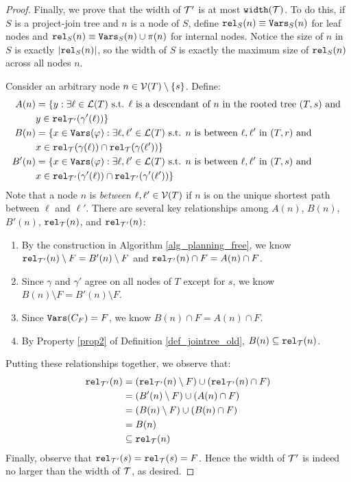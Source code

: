 \begin{proof}
Finally, we prove that the width of $\mathcal{T}'$ is at most $\texttt{\upshape width}(\mathcal{T})$. 
To do this, if $S$ is a project-join tree and $n$ is a node of $S$, define $\texttt{\upshape rel}_S(n) \equiv \texttt{\upshape Vars}_S(n)$ for leaf nodes and $\texttt{\upshape rel}_S(n) \equiv \texttt{\upshape Vars}_S(n) \cup \pi(n)$ for internal nodes. Notice the size of $n$ in $S$ is exactly $|\texttt{\upshape rel}_S(n)|$, so the width of $S$ is exactly the maximum size of $\texttt{\upshape rel}_S(n)$ across all nodes $n$. 

Consider an arbitrary node $n \in \mathcal{V}(T) \setminus \{s\}$. Define:
\begin{align*}
    A(n) &= \{ y : \exists \ell \in \mathcal{L}(T) \text{ s.t. $\ell$ is a descendant of $n$ in the rooted tree $(T, s)$ and } \\&y \in \texttt{\upshape rel}_{\mathcal{T}'}(\gamma'(\ell)) \} \\
    B(n) &= \{ x \in \texttt{\upshape Vars}(\varphi) : \exists \ell, \ell' \in \mathcal{L}(T) \text{ s.t. $n$ is between $\ell, \ell'$ in $(T, r)$ and } \\&x \in \texttt{\upshape rel}_{\mathcal{T}}(\gamma(\ell)) \cap \texttt{\upshape rel}_{\mathcal{T}}(\gamma(\ell')) \} \\
    B'(n) &= \{ x \in \texttt{\upshape Vars}(\varphi) : \exists \ell, \ell' \in \mathcal{L}(T) \text{ s.t. $n$ is between $\ell, \ell'$ in $(T, s)$ and } \\&x \in \texttt{\upshape rel}_{\mathcal{T}'}(\gamma'(\ell)) \cap \texttt{\upshape rel}_{\mathcal{T}'}(\gamma'(\ell')) \}
\end{align*}
Note that a node $n$ is \emph{between} $\ell, \ell' \in \mathcal{V}(T)$ if $n$ is on the unique shortest path between $\ell$ and $\ell'$. There are several key relationships among $A(n)$, $B(n)$, $B'(n)$, $\texttt{\upshape rel}_{\mathcal{T}}(n)$, and $\texttt{\upshape rel}_{\mathcal{T}'}(n)$: 
\begin{enumerate}
    \item By the construction in Algorithm \ref{alg_planning_free}, we know $\texttt{\upshape rel}_{\mathcal{T}'}(n) \setminus F = B'(n) \setminus F$ and $\texttt{\upshape rel}_{\mathcal{T}'}(n) \cap F = A(n) \cap F$.
    \item Since $\gamma$ and $\gamma'$ agree on all nodes of $T$ except for $s$, we know $B(n) \setminus F = B'(n) \setminus F$.
    \item Since $\texttt{\upshape Vars}(C_F) = F$, we know $B(n) \cap F = A(n) \cap F$.
    \item By Property \ref{prop2} of Definition \ref{def_jointree_old}, $B(n) \subseteq \texttt{\upshape rel}_{\mathcal{T}}(n)$. 
\end{enumerate}
Putting these relationships together, we observe that:
\begin{align*}
    \texttt{\upshape rel}_{\mathcal{T}'}(n) &= (\texttt{\upshape rel}_{\mathcal{T}'}(n) \setminus F) \cup (\texttt{\upshape rel}_{\mathcal{T}'}(n) \cap F) \\
    &= (B'(n) \setminus F) \cup (A(n) \cap F) \\
    &= (B(n) \setminus F) \cup (B(n) \cap F) \\
    &= B(n) \\
    &\subseteq \texttt{\upshape rel}_{\mathcal{T}}(n)
\end{align*}
Finally, observe that $\texttt{\upshape rel}_{\mathcal{T}'}(s) = \texttt{\upshape rel}_{\mathcal{T}}(s) = F$.
Hence the width of $\mathcal{T}'$ is indeed no larger than the width of $\mathcal{T}$, as desired.
\end{proof}
 
